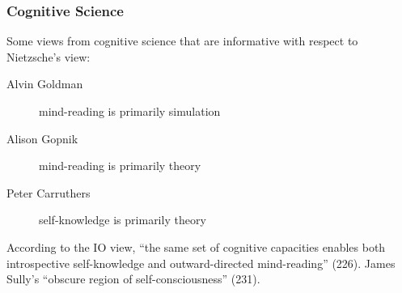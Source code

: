 \documentclass[xcolor=dvipsnames]{beamer}
\begin{document}
\begin{frame}
  \frametitle{Cognitive Science}
  Some views from cognitive science that are informative with respect
  to Nietzsche's view:
  \begin{description}
  \item[Alvin Goldman] mind-reading is primarily simulation
  \item[Alison Gopnik] mind-reading is primarily theory
  \item[Peter Carruthers] self-knowledge is primarily theory
  \end{description}
According to the IO view, ``the same set of cognitive capacities
enables both introspective self-knowledge and outward-directed
mind-reading'' (226). James Sully's ``obscure region of
self-consciousness'' (231).
\end{frame}

\end{document}
